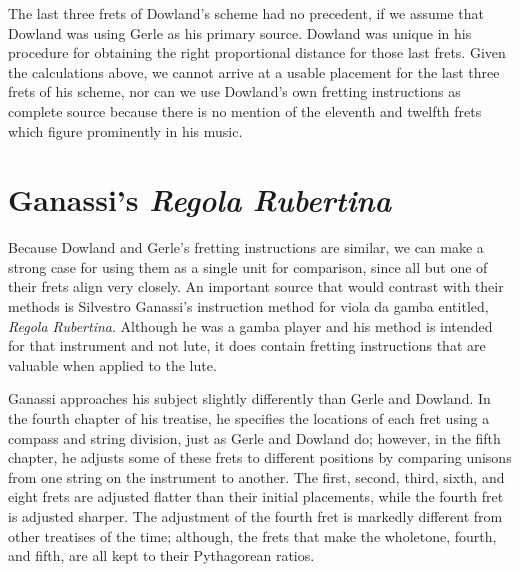 The last three frets of Dowland's scheme had no precedent, if we assume that Dowland was using Gerle as his primary
source. Dowland was unique in his procedure for obtaining the right proportional distance for those last frets. Given
the calculations above, we cannot arrive at a usable placement for the last three frets of his scheme, nor can we use
Dowland's own fretting instructions as complete source because there is no mention of the eleventh and twelfth frets
which figure prominently in his music.

\section{Ganassi's \textit{Regola Rubertina}}

Because Dowland and Gerle's fretting instructions are similar, we can make a strong case for using them as a single unit
for comparison, since all but one of their frets align very closely. An important source that would contrast with their
methods is Silvestro Ganassi's instruction method for viola da gamba entitled, \textit{Regola Rubertina}. Although he
was a gamba player and his method is intended for that instrument and not lute, it does contain fretting instructions
that are valuable when applied to the lute.

Ganassi approaches his subject slightly differently than Gerle and Dowland. In the fourth chapter of his treatise, he
specifies the locations of each fret using a compass and string division, just as Gerle and Dowland do; however, in the
fifth chapter, he adjusts some of these frets to different positions by comparing unisons from one string on the
instrument to another. The first, second, third, sixth, and eight frets are adjusted flatter than their initial
placements, while the fourth fret is adjusted sharper. The adjustment of the fourth fret is markedly different from
other treatises of the time; although, the frets that make the wholetone, fourth, and fifth, are all kept to their
Pythagorean ratios.

